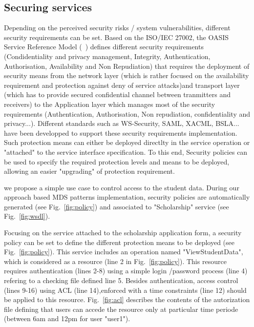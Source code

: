 \documentclass[runningheads,a4paper]{llncs}
\begin{document}
\subsection{Securing services}
Depending on the perceived security risks / system vulnerabilities, different security requirements can be set. Based on the ISO/IEC 27002, the OASIS Service Reference Model (~\cite{OAS06}) defines different security requirements (Condidentiality and privacy management, Integrity, Authentication, Authorisation, Availability and Non Repudiation) that  requires the deployment of security means from the network layer (which is rather focused on the availability requirement and protection against deny of service attacks)and transport layer (which has to provide secured confidential channel between tranmitters and receivers) to the Application layer which manages most of the security requirements (Authentication, Authorisation, Non repudiation, confidentiality and privacy...). Different standards such as WS-Security, SAML, XACML, BSLA... have been developped to support these security requirements implementation.
Such protection means can either be deployed directlty in the service operation or "attached" to the service interface specification. To this end, Security policies can be used to specify the required protection levels and means to be deployed, allowing an easier "upgrading" of protection requirement. 



we propose a simple use case to control access to the student data. During our approach based MDS patterns implementation, security policies are automatically generated (see Fig.~\ref{fig:policy}) and associated to "Scholarship" service (see Fig.~\ref{fig:wsdl}).


Focusing on the service attached to the scholarship application form, a security policy can be set to define the different protection means to be deployed (see Fig.~\ref{fig:policy}). This service includes an  operation named "ViewStudentData", which is considered as a resource (line 2 in
Fig.~\ref{fig:policy}). This resource requires authentication (lines 2-8) using a simple login /password process (line 4) refering to a checking file defined line 5. Besides authentication, access control (lines 9-16) using ACL (line 14),enforced  with a time constraints (line 12) should be applied to this resource. Fig.~\ref{fig:acl} describes the contents of the autorization file defining that users can accede the resource only at particular time periode (between 6am and 12pm for user "user1").
\end{document}
